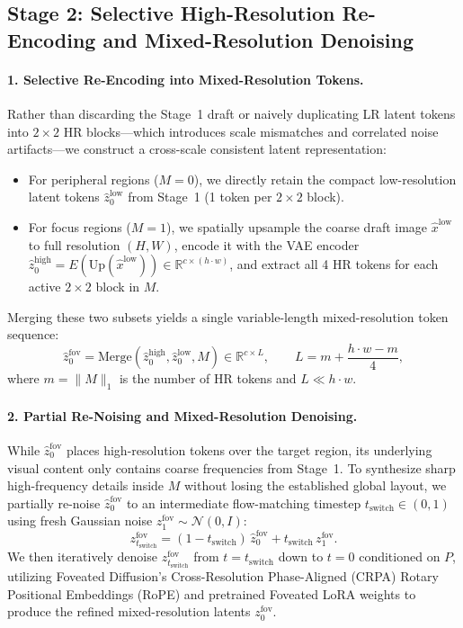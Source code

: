 \documentclass[11pt]{article}
\begin{document}
\subsection{Stage 2: Selective High-Resolution Re-Encoding and Mixed-Resolution Denoising}

\paragraph{1. Selective Re-Encoding into Mixed-Resolution Tokens.}
Rather than discarding the Stage~1 draft or naively duplicating LR latent tokens into $2 \times 2$ HR blocks---which introduces scale mismatches and correlated noise artifacts---we construct a cross-scale consistent latent representation:
\begin{itemize}
    \item For peripheral regions ($M = 0$), we directly retain the compact low-resolution latent tokens $\hat{z}_0^{\text{low}}$ from Stage~1 (1 token per $2 \times 2$ block).
    \item For focus regions ($M = 1$), we spatially upsample the coarse draft image $\hat{x}^{\text{low}}$ to full resolution $(H, W)$, encode it with the VAE encoder $\hat{z}_0^{\text{high}} = E(\mathrm{Up}(\hat{x}^{\text{low}})) \in \mathbb{R}^{c \times (h \cdot w)}$, and extract all 4 HR tokens for each active $2 \times 2$ block in $M$.
\end{itemize}
Merging these two subsets yields a single variable-length mixed-resolution token sequence:
\begin{equation}
    \hat{z}_0^{\text{fov}} = \mathrm{Merge}(\hat{z}_0^{\text{high}}, \hat{z}_0^{\text{low}}, M) \in \mathbb{R}^{c \times L}, \qquad L = m + \frac{h \cdot w - m}{4},
\end{equation}
where $m = \|M\|_1$ is the number of HR tokens and $L \ll h \cdot w$.

\paragraph{2. Partial Re-Noising and Mixed-Resolution Denoising.}
While $\hat{z}_0^{\text{fov}}$ places high-resolution tokens over the target region, its underlying visual content only contains coarse frequencies from Stage~1. To synthesize sharp high-frequency details inside $M$ without losing the established global layout, we partially re-noise $\hat{z}_0^{\text{fov}}$ to an intermediate flow-matching timestep $t_{\text{switch}} \in (0, 1)$ using fresh Gaussian noise $z_1^{\text{fov}} \sim \mathcal{N}(0, I)$:
\begin{equation}
    z_{t_{\text{switch}}}^{\text{fov}} = (1 - t_{\text{switch}})\,\hat{z}_0^{\text{fov}} + t_{\text{switch}}\,z_1^{\text{fov}}.
\end{equation}
We then iteratively denoise $z_{t_{\text{switch}}}^{\text{fov}}$ from $t = t_{\text{switch}}$ down to $t = 0$ conditioned on $P$, utilizing Foveated Diffusion's Cross-Resolution Phase-Aligned (CRPA) Rotary Positional Embeddings (RoPE) and pretrained Foveated LoRA weights to produce the refined mixed-resolution latents $z_0^{\text{fov}}$.
\end{document}
